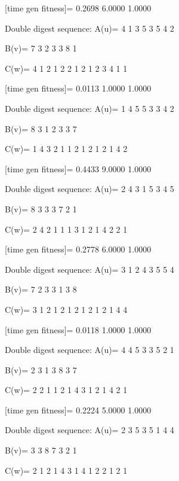 [time gen fitness]=
    0.2698    6.0000    1.0000

Double digest sequence:
A(u)=
     4     1     3     5     3     5     4     2

B(v)=
     7     3     2     3     3     8     1

C(w)=
     4     1     2     1     2     2     1     2     1     2     3     4     1     1

[time gen fitness]=
    0.0113    1.0000    1.0000

Double digest sequence:
A(u)=
     1     4     5     5     3     3     4     2

B(v)=
     8     3     1     2     3     3     7

C(w)=
     1     4     3     2     1     1     2     1     2     1     2     1     4     2

[time gen fitness]=
    0.4433    9.0000    1.0000

Double digest sequence:
A(u)=
     2     4     3     1     5     3     4     5

B(v)=
     8     3     3     3     7     2     1

C(w)=
     2     4     2     1     1     1     3     1     2     1     4     2     2     1

[time gen fitness]=
    0.2778    6.0000    1.0000

Double digest sequence:
A(u)=
     3     1     2     4     3     5     5     4

B(v)=
     7     2     3     3     1     3     8

C(w)=
     3     1     2     1     2     1     2     1     2     1     2     1     4     4

[time gen fitness]=
    0.0118    1.0000    1.0000

Double digest sequence:
A(u)=
     4     4     5     3     3     5     2     1

B(v)=
     2     3     1     3     8     3     7

C(w)=
     2     2     1     1     2     1     4     3     1     2     1     4     2     1

[time gen fitness]=
    0.2224    5.0000    1.0000

Double digest sequence:
A(u)=
     2     3     5     3     5     1     4     4

B(v)=
     3     3     8     7     3     2     1

C(w)=
     2     1     2     1     4     3     1     4     1     2     2     1     2     1


